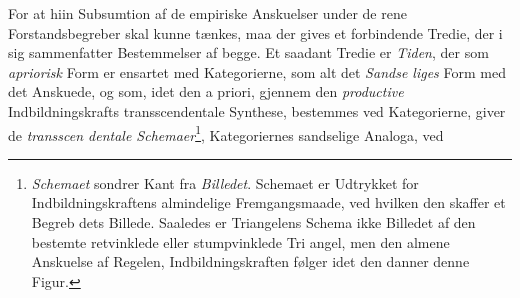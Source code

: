 \documentclass[12pt,a4paper]{book}
\begin{document}
For at hiin Subsumtion af de empiriske Anskuelser under
de rene Forstandsbegreber skal kunne tænkes, maa der gives
et forbindende Tredie, der i sig sammenfatter Bestemmelser
af begge. Et saadant Tredie er \emph{Tiden}, der som \emph{apriorisk}
Form er ensartet med Kategorierne, som alt det \emph{Sandse\-%
liges} Form med det Anskuede, og som, idet den a priori,
\setcounter{footnote}{0}%
gjennem den \emph{productive} Indbildningskrafts transscendentale
Synthese, bestemmes ved Kategorierne, giver de \emph{transscen\-%
dentale Schemaer}\footnote{\emph{Schemaet} sondrer Kant fra \emph{Billedet}. Schemaet er Udtrykket
for Indbildningskraftens almindelige Fremgangsmaade, ved hvilken
den skaffer et Begreb dets Billede. Saaledes er Triangelens Schema
ikke Billedet af den bestemte retvinklede eller stumpvinklede Tri\-%
angel, men den almene Anskuelse af Regelen, Indbildningskraften
følger idet den danner denne Figur.}, Kategoriernes sandselige Analoga, ved
\end{document}
